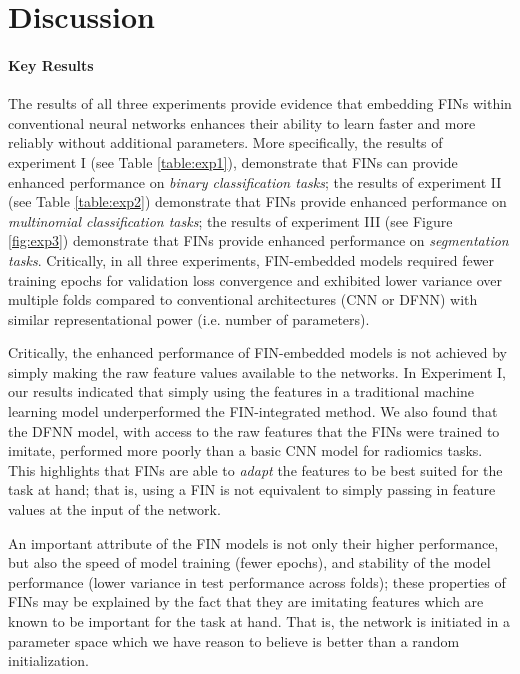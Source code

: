 \documentclass[conference]{IEEEtran}
\begin{document}
\section{Discussion} \label{sec:Disc}


\paragraph*{Key Results} The results of all three experiments provide evidence that embedding FINs within conventional neural networks enhances their ability to learn faster and more reliably without additional parameters. More specifically, the results of experiment I (see Table \ref{table:exp1}), demonstrate that FINs can provide enhanced performance on \textit{binary classification tasks}; the results of experiment II (see Table \ref{table:exp2}) demonstrate that FINs provide enhanced performance on \textit{multinomial classification tasks}; the results of experiment III (see Figure \ref{fig:exp3}) demonstrate that FINs provide enhanced performance on \textit{segmentation tasks}. Critically, in all three experiments, FIN-embedded models required fewer training epochs for validation loss convergence and exhibited lower variance over multiple folds compared to conventional architectures (CNN or DFNN) with similar representational power (i.e. number of parameters).

Critically, the enhanced performance of  FIN-embedded models is not achieved by simply making the raw feature values available to the networks. In Experiment I, our results indicated that simply using the features in a traditional machine learning model underperformed the FIN-integrated method. We also found that the DFNN model, with access to the raw features that the FINs were trained to imitate, performed more poorly than a basic CNN model for radiomics tasks. This highlights that FINs are able to \textit{adapt} the features to be best suited for the task at hand; that is, using a FIN is not equivalent to simply passing in feature values at the input of the network. 

An important attribute of the FIN models is not only their higher performance, but also the speed of model training (fewer epochs), and stability of the model performance (lower variance in test performance across folds); these properties of FINs may be explained by the fact that they are imitating features which are known to be important for the task at hand. That is, the network is initiated in a parameter space which we have reason to believe is better than a random initialization.
\end{document}
